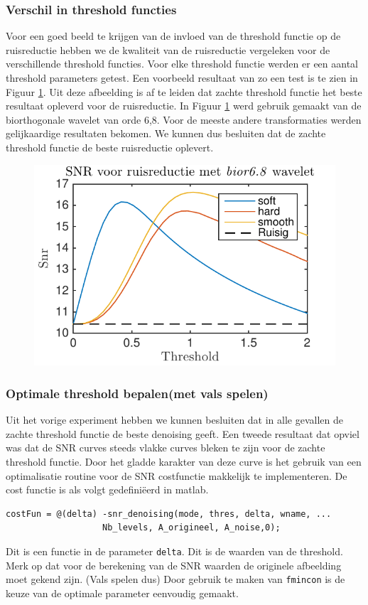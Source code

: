 \subsubsection{Verschil in threshold functies}

Voor een goed beeld te krijgen van de invloed van de threshold functie op de ruisreductie hebben we de kwaliteit van de ruisreductie vergeleken voor de verschillende threshold functies.
Voor elke threshold functie werden er een aantal threshold parameters getest.
Een voorbeeld resultaat van zo een test is te zien in Figuur \ref{fig:snr_image_bior6}.
Uit deze afbeelding is af te leiden dat zachte threshold functie het beste resultaat opleverd voor de ruisreductie.
In Figuur \ref{fig:snr_image_bior6} werd gebruik gemaakt van de biorthogonale wavelet van orde 6,8.
Voor de meeste andere transformaties werden gelijkaardige resultaten bekomen.
We kunnen dus besluiten dat de zachte threshold functie de beste ruisreductie oplevert.


\begin{figure}
\centering
\includegraphics[width=0.7\linewidth]{../src/denoising/image/snr_image_bior68_30.pdf}
\caption{}
\label{fig:snr_image_bior6}
\end{figure}


\subsubsection{Optimale threshold bepalen(met vals spelen)}

Uit het vorige experiment hebben we kunnen besluiten dat in alle gevallen de zachte threshold functie de beste denoising geeft.
Een tweede resultaat dat opviel was dat de SNR curves steeds vlakke curves bleken te zijn voor de zachte threshold functie.
Door het gladde karakter van deze curve is het gebruik van een optimalisatie routine voor de SNR costfunctie makkelijk te implementeren.
De cost functie is als volgt gedefini\"eerd in matlab.
\begin{verbatim}
costFun = @(delta) -snr_denoising(mode, thres, delta, wname, ...
                   Nb_levels, A_origineel, A_noise,0);
\end{verbatim}
Dit is een functie in de parameter \verb|delta|. Dit is de waarden van de threshold.
Merk op dat voor de berekening van de SNR waarden de originele afbeelding moet gekend zijn. (Vals spelen dus)
Door gebruik te maken van \verb|fmincon| is de keuze van de optimale parameter eenvoudig gemaakt.

